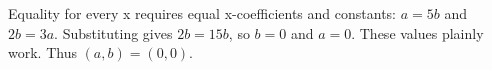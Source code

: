 Equality for every x requires equal x-coefficients and constants: $a=5 b$ and $2 b=3 a$. Substituting gives $2 b=15 b$, so $b=0$ and $a=0$. These values plainly work. Thus $\boxed{(a,b)=(0,0)}$.
